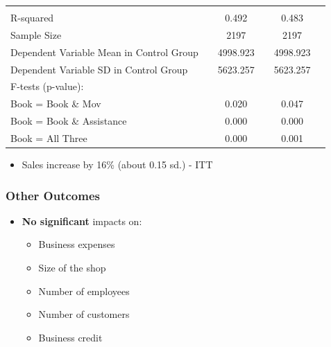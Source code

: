 \documentclass[hideothersubsections, usenames,dvipsnames,10pt]{beamer}
\begin{document}
\begin{frame}
{{\begin{table}[t]
\begin{tabular}{l*{5}{c}}
   	\\
\hline         							
\\
R-squared											  	&& 0.492  	&&  0.483	\\
Sample Size 											&& 2197	&& 2197 	\\
Dependent Variable Mean in Control Group			 	&&         4998.923   &&	          4998.923 	\\
Dependent Variable SD in Control Group				 	&&         5623.257   	&&           5623.257	\\
F-tests (p-value):											&&			&&			\\
\hspace{5mm}Book = Book \& Mov				        	&&            0.020 	&&           0.047 	\\
\hspace{5mm}Book = Book \& Assistance				  			&&0.000   	&& 0.000 	\\
\hspace{5mm}Book = All Three			   			  	&&0.000   	&&0.001  	\\
\hline
	\end{tabular}

\end{table}}}
\begin{itemize}
\item Sales increase by 16\% (about 0.15 sd.) - ITT %
\end{itemize}
\end{frame}


\begin{frame}
\frametitle{Other Outcomes}
\begin{itemize}
\item \textbf{No significant} impacts on:
    \begin{itemize}
    \vspace{0.2in}
    \item Business expenses
    \vspace{0.2in} 		
    \item Size of the shop
      \vspace{0.2in}
    \item Number of employees
      \vspace{0.2in}
    \item Number of customers
       \vspace{0.2in}
     \item Business credit
    \end{itemize}
\end{itemize}
\end{frame}
\end{document}
